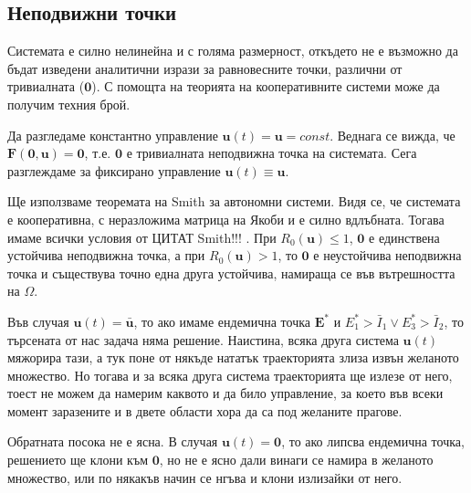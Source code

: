 \subsection{Неподвижни точки}
Системата е силно нелинейна и с голяма размерност, откъдето не е възможно да бъдат изведени аналитични изрази за равновесните точки, различни от тривиалната ($\mathbf{0}$). С помощта на теорията на кооперативните системи може да получим техния брой.

Да разгледаме константно управление $\mathbf{u}(t)=\mathbf{u}=const$. Веднага се вижда, че $\mathbf{F}(\mathbf{0}, \mathbf{u}) = \mathbf{0}$, т.е. $\mathbf{0}$ е тривиалната неподвижна точка на системата.
Сега разглеждаме за фиксирано управление $\mathbf{u}(t) \equiv \mathbf{u}$.

Ще използваме теоремата на Smith за автономни системи. Видя се, че системата е кооперативна, с неразложима матрица на Якоби и е силно вдлъбната. Тогава имаме всички условия от
\color{Red} ЦИТАТ Smith!!!
\color{Black}
.
При $R_0(\mathbf{u}) \leq 1$, $\mathbf{0}$ е единствена устойчива неподвижна точка, а при $R_0(\mathbf{u}) > 1$, то $\mathbf{0}$ е неустойчива неподвижна точка и съществува точно една друга устойчива, намираща се във вътрешността на $\Omega$.

Във случая $\mathbf{u}(t)=\bar{\mathbf{u}}$, то ако имаме ендемична точка $\mathbf{E}^*$ и $E_1^* > \bar{I}_1 \lor E_3^* > \bar{I}_2$, то търсената от нас задача няма решение. Наистина, всяка друга система $\mathbf{u}(t)$ мяжорира тази, а тук поне от някъде нататък траекторията злиза извън желаното множество. Но тогава и за всяка друга система траекторията ще излезе от него, тоест не можем да намерим каквото и да било управление, за което във всеки момент заразените и в двете области хора да са под желаните прагове.

Обратната посока не е ясна. В случая $\mathbf{u}(t)=\mathbf{0}$, то ако липсва ендемична точка, решението ще клони към $\mathbf{0}$, но не е ясно дали винаги се намира в желаното множество, или по някакъв начин се нгъва и клони излизайки от него.

